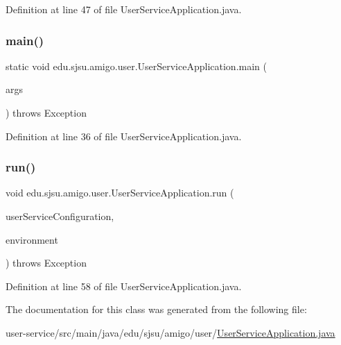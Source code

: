 Definition at line 47 of file User\+Service\+Application.\+java.

\mbox{\label{classedu_1_1sjsu_1_1amigo_1_1user_1_1_user_service_application_a469bc4d2ead8252f9b98a2909ec436e0}} 
\subsubsection{\texorpdfstring{main()}{main()}}
{\footnotesize\ttfamily static void edu.\+sjsu.\+amigo.\+user.\+User\+Service\+Application.\+main (\begin{DoxyParamCaption}\item[{final String \mbox{[}$\,$\mbox{]}}]{args }\end{DoxyParamCaption}) throws Exception\hspace{0.3cm}{\ttfamily [static]}}



Definition at line 36 of file User\+Service\+Application.\+java.

\mbox{\label{classedu_1_1sjsu_1_1amigo_1_1user_1_1_user_service_application_af49523f6ee55c6a49053dd6f8e34b13c}} 
\subsubsection{\texorpdfstring{run()}{run()}}
{\footnotesize\ttfamily void edu.\+sjsu.\+amigo.\+user.\+User\+Service\+Application.\+run (\begin{DoxyParamCaption}\item[{\hyperlink{classedu_1_1sjsu_1_1amigo_1_1user_1_1_user_service_configuration}{User\+Service\+Configuration}}]{user\+Service\+Configuration,  }\item[{Environment}]{environment }\end{DoxyParamCaption}) throws Exception}



Definition at line 58 of file User\+Service\+Application.\+java.



The documentation for this class was generated from the following file\+:\begin{DoxyCompactItemize}
\item 
user-\/service/src/main/java/edu/sjsu/amigo/user/\hyperlink{_user_service_application_8java}{User\+Service\+Application.\+java}\end{DoxyCompactItemize}
